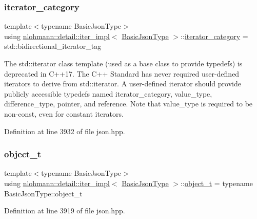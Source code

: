 \subsubsection{\texorpdfstring{iterator\+\_\+category}{iterator\_category}}
{\footnotesize\ttfamily template$<$typename Basic\+Json\+Type$>$ \\
using \hyperlink{classnlohmann_1_1detail_1_1iter__impl}{nlohmann\+::detail\+::iter\+\_\+impl}$<$ \hyperlink{classnlohmann_1_1detail_1_1iter__impl_abf18f18793f84b0222aebb5a2a87da7a}{Basic\+Json\+Type} $>$\+::\hyperlink{classnlohmann_1_1detail_1_1iter__impl_ad9e091f5c70b34b5b1abc1ab15fd9106}{iterator\+\_\+category} =  std\+::bidirectional\+\_\+iterator\+\_\+tag}

The std\+::iterator class template (used as a base class to provide typedefs) is deprecated in C++17. The C++ Standard has never required user-\/defined iterators to derive from std\+::iterator. A user-\/defined iterator should provide publicly accessible typedefs named iterator\+\_\+category, value\+\_\+type, difference\+\_\+type, pointer, and reference. Note that value\+\_\+type is required to be non-\/const, even for constant iterators. 

Definition at line 3932 of file json.\+hpp.

\mbox{\label{classnlohmann_1_1detail_1_1iter__impl_ab9a9598052e83fa14a2288e56d5dda7c}} 
\subsubsection{\texorpdfstring{object\+\_\+t}{object\_t}}
{\footnotesize\ttfamily template$<$typename Basic\+Json\+Type$>$ \\
using \hyperlink{classnlohmann_1_1detail_1_1iter__impl}{nlohmann\+::detail\+::iter\+\_\+impl}$<$ \hyperlink{classnlohmann_1_1detail_1_1iter__impl_abf18f18793f84b0222aebb5a2a87da7a}{Basic\+Json\+Type} $>$\+::\hyperlink{classnlohmann_1_1detail_1_1iter__impl_ab9a9598052e83fa14a2288e56d5dda7c}{object\+\_\+t} =  typename Basic\+Json\+Type\+::object\+\_\+t\hspace{0.3cm}{\ttfamily [private]}}



Definition at line 3919 of file json.\+hpp.


